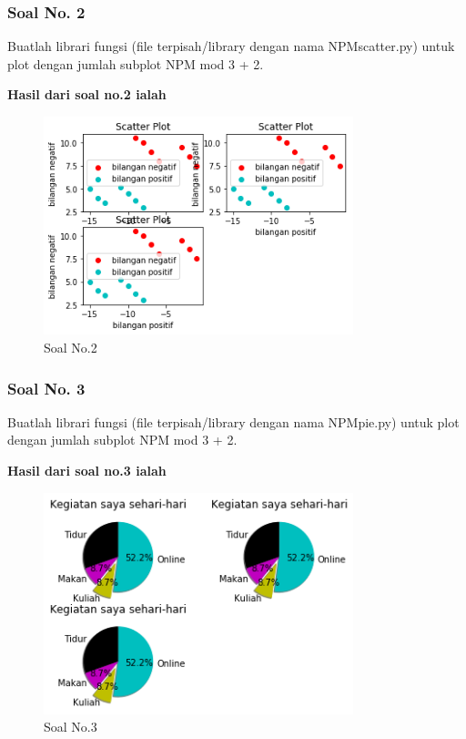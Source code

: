 \subsubsection{Soal No. 2}
\hfill \break
Buatlah librari fungsi (file terpisah/library dengan nama NPMscatter.py) untuk plot dengan jumlah subplot NPM mod 3 + 2.



\hfill \break
\textbf{Hasil dari soal no.2 ialah}

\begin{figure}[H]
	\includegraphics[width=9cm]{figures/6/1174021/p2.png}
	\centering
	\caption{Soal No.2}
\end{figure}

\subsubsection{Soal No. 3}
\hfill \break
Buatlah librari fungsi (file terpisah/library dengan nama NPMpie.py) untuk plot dengan jumlah subplot NPM mod 3 + 2.



\hfill \break
\textbf{Hasil dari soal no.3 ialah}

\begin{figure}[H]
	\includegraphics[width=9cm]{figures/6/1174021/p3.png}
	\centering
	\caption{Soal No.3}
\end{figure}

